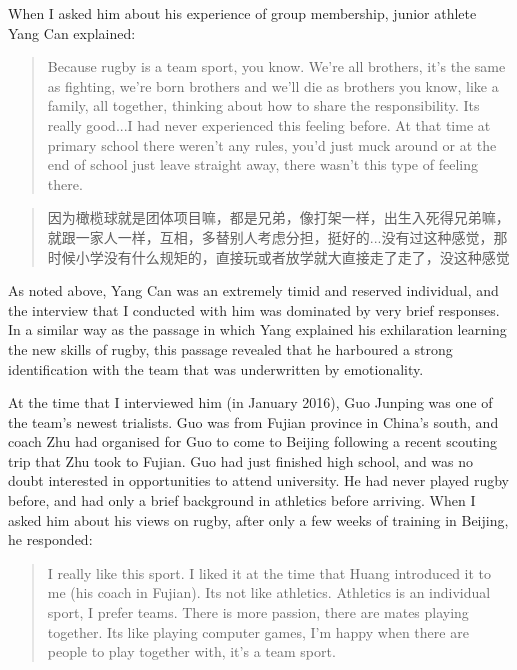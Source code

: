 \begin{CJK}{UTF8}{gbsn}
When I asked him about his experience of group membership, junior athlete Yang Can explained:

    \begin{quotation}
      Because rugby is a team sport, you know. We’re all brothers, it's the same as fighting, we’re born brothers and we’ll die as brothers you know, like a family, all together, thinking about how to share the responsibility. Its really good...I had never experienced this feeling before.  At that time at primary school there weren’t any rules, you’d just muck around or at the end of school just leave straight away, there wasn’t this type of feeling there.
    \end{quotation}

    \begin{quotation}
      因为橄榄球就是团体项目嘛，都是兄弟，像打架一样，出生入死得兄弟嘛，就跟一家人一样，互相，多替别人考虑分担，挺好的...没有过这种感觉，那时候小学没有什么规矩的，直接玩或者放学就大直接走了走了，没这种感觉
    \end{quotation}

As noted above, Yang Can was an extremely timid and reserved individual, and the interview that I conducted with him was dominated by very brief responses. In a similar way as the passage in which Yang explained his exhilaration learning the new skills of rugby, this passage revealed that he harboured a strong identification with the team that was underwritten by emotionality.


At the time that I interviewed him (in January 2016), Guo Junping was one of the team's newest trialists. Guo was from Fujian province in China's south, and coach Zhu had organised for Guo to come to Beijing following a recent scouting trip that Zhu took to Fujian.  Guo had just finished high school, and was no doubt interested in opportunities to attend university. He had never played rugby before, and had only a brief background in athletics before arriving.  When I asked him about his views on rugby, after only a few weeks of training in Beijing, he responded:

  \begin{quotation}
      I really like this sport.  I liked it at the time that Huang introduced it to me (his coach in Fujian). Its not like athletics.  Athletics is an individual sport, I prefer teams.  There is more passion, there are mates playing together.  Its like playing computer games, I’m happy when there are people to play together with, it's a team sport.
  \end{quotation}


\end{CJK}
